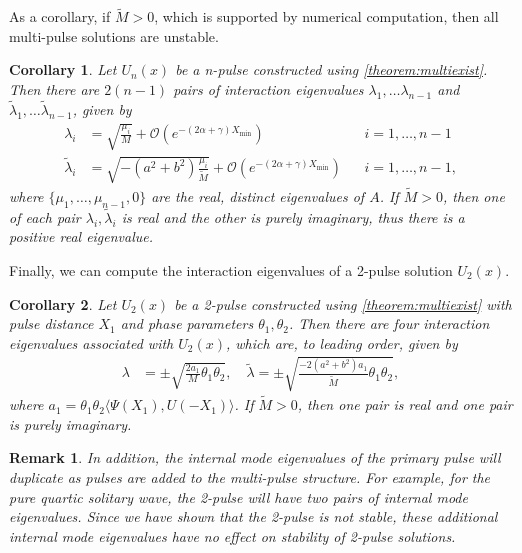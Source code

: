 \documentclass[12pt]{article}
\newtheorem{corollary}{Corollary}
\newtheorem{remark}{Remark}
\begin{document}
As a corollary, if $\tilde{M} > 0$, which is supported by numerical computation, then all multi-pulse solutions are unstable.

\begin{corollary}\label{corr:multiunstable}
Let $U_n(x)$ be a n-pulse constructed using \cref{theorem:multiexist}. Then there are $2(n-1)$ pairs of interaction eigenvalues $\lambda_1, \dots \lambda_{n-1}$ and $\tilde{\lambda}_1, \dots \tilde{\lambda}_{n-1}$, given by
\begin{equation}\label{inteigs}
\begin{aligned}
\lambda_i &= \sqrt{\frac{\mu_i}{M}} + \mathcal{O}\left( e^{-(2 \alpha + \gamma)X_{\min} } \right) && i = 1, \dots, n-1 \\
\tilde{\lambda}_i &= \sqrt{-(a^2 + b^2) \frac{\mu_i}{\tilde{M}}} + \mathcal{O}\left( e^{-(2 \alpha + \gamma)X_{\min} } \right) && i = 1, \dots, n-1,
\end{aligned}
\end{equation}
where $\{ \mu_1,\dots,\mu_{n-1}, 0\}$ are the real, distinct eigenvalues of $A$. If $\tilde{M} > 0$, then one of each pair $\lambda_i, \tilde{\lambda}_i$ is real and the other is purely imaginary, thus there is a positive real eigenvalue.
\end{corollary}

Finally, we can compute the interaction eigenvalues of a 2-pulse solution $U_2(x)$.

\begin{corollary}\label{corr:2pstab}
Let $U_2(x)$ be a 2-pulse constructed using \cref{theorem:multiexist} with pulse distance $X_1$ and phase parameters $\theta_1, \theta_2$. Then there are four interaction eigenvalues associated with $U_2(x)$, which are, to leading order, given by
\begin{equation}\label{inteigpred}
\begin{aligned}
\lambda &= \pm \sqrt{ \frac{2 a_1}{M} \theta_1 \theta_2 }, \quad
\tilde{\lambda} = \pm \sqrt{ \frac{-2 (a^2 + b^2) a_1}{\tilde{M}} \theta_1 \theta_2 },
\end{aligned}
\end{equation}
where $a_1 = \theta_1 \theta_2 \langle \Psi(X_1), U(-X_1) \rangle$. If $\tilde{M} > 0$, then one pair is real and one pair is purely imaginary.
\end{corollary}

\begin{remark}In addition, the internal mode eigenvalues of the primary pulse will duplicate as pulses are added to the multi-pulse structure. For example, for the pure quartic solitary wave, the 2-pulse will have two pairs of internal mode eigenvalues. Since we have shown that the 2-pulse is not stable, these additional internal mode eigenvalues have no effect on stability of 2-pulse solutions.
\end{remark}
\end{document}
